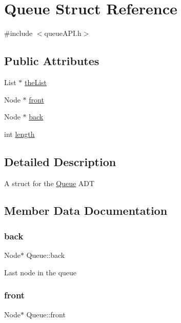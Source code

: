 \hypertarget{structQueue}{}\section{Queue Struct Reference}
\label{structQueue}


{\ttfamily \#include $<$queue\+A\+P\+I.\+h$>$}

\subsection*{Public Attributes}
\begin{DoxyCompactItemize}
\item 
List $\ast$ \hyperlink{structQueue_a10b93f38cf61fc10d4bd49942eb475f1}{the\+List}
\item 
Node $\ast$ \hyperlink{structQueue_a36ab375d24d41bcc1d598c132700835b}{front}
\item 
Node $\ast$ \hyperlink{structQueue_aaf188b8da9524a67e909f14d78563dab}{back}
\item 
int \hyperlink{structQueue_a72159731344d08720fbb96bc482b9c10}{length}
\end{DoxyCompactItemize}


\subsection{Detailed Description}
A struct for the \hyperlink{structQueue}{Queue} A\+DT 

\subsection{Member Data Documentation}
\mbox{\label{structQueue_aaf188b8da9524a67e909f14d78563dab}} 
\subsubsection{\texorpdfstring{back}{back}}
{\footnotesize\ttfamily Node$\ast$ Queue\+::back}

Last node in the queue \mbox{\label{structQueue_a36ab375d24d41bcc1d598c132700835b}} 
\subsubsection{\texorpdfstring{front}{front}}
{\footnotesize\ttfamily Node$\ast$ Queue\+::front}

